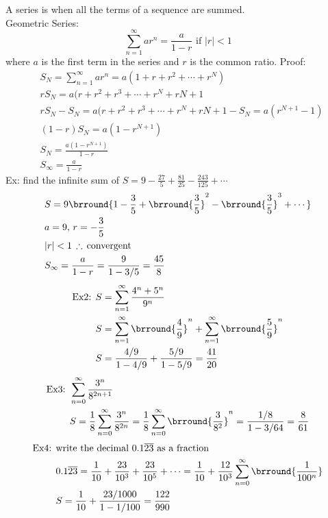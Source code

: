 A series is when all the terms of a sequence are summed.\\
Geometric Series:
$$\sum_{n=1}^\infty ar^n=\frac{a}{1-r}\text{ if $|r|<1$}$$
where $a$ is the first term in the series and $r$ is the common ratio.
Proof:
\begin{align*}
    &S_N=\sum_{n=1}^\infty ar^n=a(1+r+r^2+\cdots+r^N)\\
    &rS_N=a(r+r^2+r^3+\cdots+r^N+r{N+1}\\
    &rS_N-S_N=a(r+r^2+r^3+\cdots+r^N+r{N+1}-S_N=a(r^{N+1}-1)\\
    &(1-r)S_N=a(1-r^{N+1})\\
    &S_N=\frac{a(1-r^{N+1})}{1-r}\\
    &S_\infty=\frac{a}{1-r}
\end{align*}
Ex: find the infinite sum of ${S=9-\frac{27}{5}+\frac{81}{25}-\frac{243}{125}+\cdots}$
\begin{align*}
    &S=9\brround{1-\frac{3}{5}+\brround{\frac{3}{5}}^2-\brround{\frac{3}{5}}^3+\cdots}\\
    &a=9,\,r=-\frac{3}{5}\\
    &|r|<1\,\therefore\,\text{convergent}\\
    &S_\infty=\frac{a}{1-r}=\frac{9}{1-3/5}=\frac{45}{8}
\end{align*}
\begin{align*}
    \text{Ex2: }&S=\sum_{n=1}^\infty\frac{4^n+5^n}{9^n}\\
    &S=\sum_{n=1}^\infty\brround{\frac{4}{9}}^n+\sum_{n=1}^\infty\brround{\frac{5}{9}}^n\\
    &S=\frac{4/9}{1-4/9}+\frac{5/9}{1-5/9}=\frac{41}{20}
\end{align*}
\begin{align*}
    \text{Ex3: }&\sum_{n=0}^\infty\frac{3^n}{8^{2n+1}}\\
    &S=\frac{1}{8}\sum_{n=0}^\infty\frac{3^n}{8^{2n}}=\frac{1}{8}\sum_{n=0}^\infty\brround{\frac{3}{8^2}}^n=\frac{1/8}{1-3/64}=\frac{8}{61}
\end{align*}
\begin{align*}
    \text{Ex4: }&\text{write the decimal $0.1\overline{23}$ as a fraction}\\
    &0.1\overline{23}=\frac{1}{10}+\frac{23}{10^3}+\frac{23}{10^5}+\cdots=\frac{1}{10}+\frac{12}{10^3}\sum_{n=0}^\infty\brround{\frac{1}{100^n}}\\
    &S=\frac{1}{10}+\frac{23/1000}{1-1/100}=\frac{122}{990}
\end{align*}

